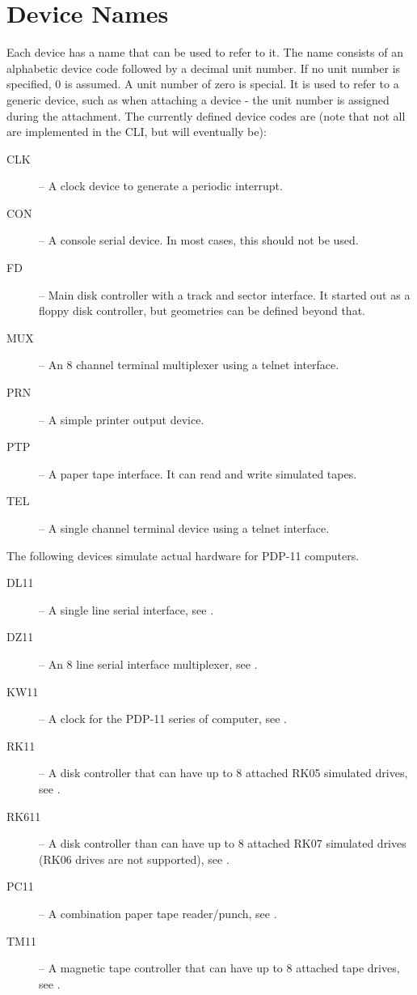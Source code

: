 \documentclass[10pt, openany]{book}
\begin{document}
\section{Device Names}
Each device has a name that can be used to refer to it.
The name consists of an alphabetic device code followed by a decimal unit number.
If no unit number is specified, 0 is assumed.
A unit number of zero is special.
It is used to refer to a generic device, such as when attaching a device - the unit number is assigned during the attachment.
The currently defined device codes are (note that not all are implemented in the CLI, but will eventually be):
\begin{description}
  \item[CLK] -- A clock device to generate a periodic interrupt.
  \item[CON] -- A console serial device.  In most cases, this should not be used.
  \item[FD] -- Main disk controller with a track and sector interface.  It started out as a floppy disk controller, but geometries can be defined beyond that.
  \item[MUX] -- An 8 channel terminal multiplexer using a telnet interface.
  \item[PRN] -- A simple printer output device.
  \item[PTP] -- A paper tape interface.  It can read and write simulated tapes.
  \item[TEL] -- A single channel terminal device using a telnet interface.
\end{description}
The following devices simulate actual hardware for PDP-11 computers.
\begin{description}
  \item[DL11] --  A single line serial interface, see \cite{DL11}.
  \item[DZ11] -- An 8 line serial interface multiplexer, see \cite{DZ11}.
  \item[KW11] -- A clock for the PDP-11 series of computer, see \cite{KW11L}.
  \item[RK11] -- A disk controller that can have up to 8 attached RK05 simulated drives, see \cite{RK11}.
  \item[RK611] -- A disk controller than can have up to 8 attached RK07 simulated drives (RK06 drives are not supported), see \cite{RK611}.
  \item[PC11] -- A combination paper tape reader/punch, see \cite{PC11}.
  \item[TM11] -- A magnetic tape controller that can have up to 8 attached tape drives, see \cite{TM11}.
\end{description}
\end{document}
